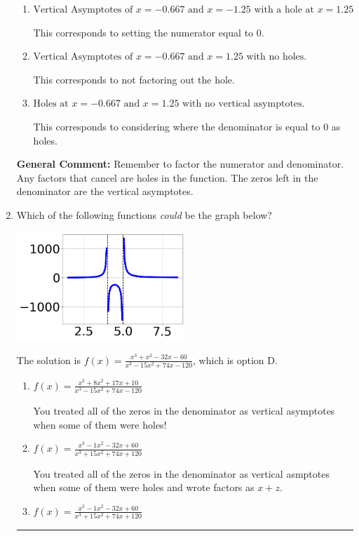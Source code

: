 \documentclass{extbook}[14pt]
\newcommand{\litem}[1]{\item #1

\rule{\textwidth}{0.4pt}}
\begin{document}
\begin{enumerate}
{\begin{enumerate}[label=\Alph*.]
This is the correct answer.
\item \( \text{Vertical Asymptotes of } x = -0.667 \text{ and } x = -1.25 \text{ with a hole at } x = 1.25 \)

This corresponds to setting the numerator equal to 0.
\item \( \text{Vertical Asymptotes of } x = -0.667 \text{ and } x = 1.25 \text{ with no holes.} \)

This corresponds to not factoring out the hole.
\item \( \text{Holes at } x = -0.667 \text{ and } x = 1.25 \text{ with no vertical asymptotes.} \)

This corresponds to considering where the denominator is equal to 0 as holes.
\end{enumerate}

\textbf{General Comment:} Remember to factor the numerator and denominator. Any factors that cancel are holes in the function. The zeros left in the denominator are the vertical asymptotes.
}
\litem{
Which of the following functions \textit{could} be the graph below?

\begin{center}
    \includegraphics[width=0.5\textwidth]{../Figures/identifyGraphOfRationalFunctionCopyA.png}
\end{center}


The solution is \( f(x)=\frac{x^{3} + x^{2} -32 x -60}{x^{3} -15 x^{2} +74 x -120} \), which is option D.\begin{enumerate}[label=\Alph*.]
\item \( f(x)=\frac{x^{3} +8 x^{2} +17 x + 10}{x^{3} -15 x^{2} +74 x -120} \)

You treated all of the zeros in the denominator as vertical asymptotes when some of them were holes!
\item \( f(x)=\frac{x^{3} -1 x^{2} -32 x + 60}{x^{3} +15 x^{2} +74 x + 120} \)

You treated all of the zeros in the denominator as vertical asmptotes when some of them were holes and wrote factors as $x+z$.
\item \( f(x)=\frac{x^{3} -1 x^{2} -32 x + 60}{x^{3} +15 x^{2} +74 x + 120} \)


\end{enumerate}}
\end{enumerate}
\end{document}
